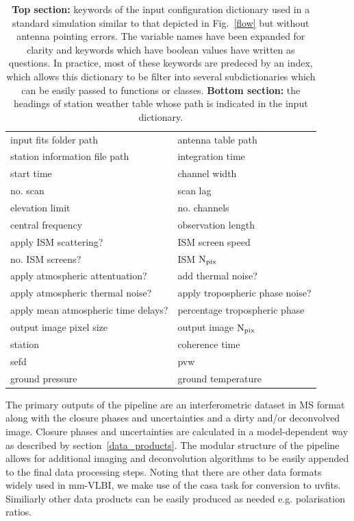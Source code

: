 \begin{table}
\caption{{\bf Top section:} keywords of the input configuration dictionary used in a standard simulation similar to that depicted in Fig.~\ref{flow} but without antenna pointing errors. The variable names have been expanded for clarity and keywords which have boolean values have written as questions. In practice, most of these keywords are predeced by an index, which allows this dictionary to be filter into several subdictionaries which can be easily passed to functions or classes. {\bf Bottom section:} the headings of station weather table whose path is indicated in the input dictionary.}
\label{tab:parameters}
\begin{tabular}{ll}
\hline
input fits folder path&antenna table path\\
station information file path&integration time\\
start time&channel width\\
no. scan&scan lag\\
elevation limit&no. channels\\
central frequency&observation length\\
apply ISM scattering?&ISM screen speed\\
no. ISM screens?&ISM ${\rm N_{pix}}$\\
apply atmospheric attentuation?&add thermal noise?\\
apply atmospheric thermal noise?&apply tropospheric phase noise?\\
apply mean atmospheric time delays?&percentage tropospheric phase \\
output image pixel size&output image ${\rm N_{pix}}$\\
\hline
\hline
station&coherence time\\
sefd&pvw\\
ground pressure&ground temperature\\
\end{tabular} 
\end{table}

The primary outputs of the pipeline are an interferometric dataset in MS format along with the closure phases and uncertainties and a dirty and/or deconvolved image. Closure phases and uncertainties are calculated in a model-dependent way as described by section~\ref{data_products}. The modular structure of the pipeline allows for additional imaging and deconvolution algorithms to be easily appended to the final data processing steps. Noting that there are other data formats widely used in mm-VLBI, we make use of the {\sc casa} task for conversion to {\sc uvfits}. Similiarly other data products can be easily produced as needed e.g. polarisation ratios.


